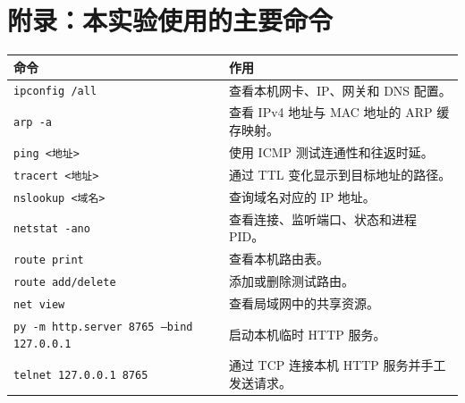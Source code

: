 \documentclass[UTF8,a4paper,zihao=-4]{ctexart}
\begin{document}
\section*{附录：本实验使用的主要命令}
\begin{longtable}{p{}p{}}
\toprule
命令 & 作用\\
\midrule
\endhead
\texttt{ipconfig /all} & 查看本机网卡、IP、网关和 DNS 配置。\\
\texttt{arp -a} & 查看 IPv4 地址与 MAC 地址的 ARP 缓存映射。\\
\texttt{ping <地址>} & 使用 ICMP 测试连通性和往返时延。\\
\texttt{tracert <地址>} & 通过 TTL 变化显示到目标地址的路径。\\
\texttt{nslookup <域名>} & 查询域名对应的 IP 地址。\\
\texttt{netstat -ano} & 查看连接、监听端口、状态和进程 PID。\\
\texttt{route print} & 查看本机路由表。\\
\texttt{route add/delete} & 添加或删除测试路由。\\
\texttt{net view} & 查看局域网中的共享资源。\\
\texttt{py -m http.server 8765 --bind 127.0.0.1} & 启动本机临时 HTTP 服务。\\
\texttt{telnet 127.0.0.1 8765} & 通过 TCP 连接本机 HTTP 服务并手工发送请求。\\
\bottomrule
\end{longtable}
\end{document}
